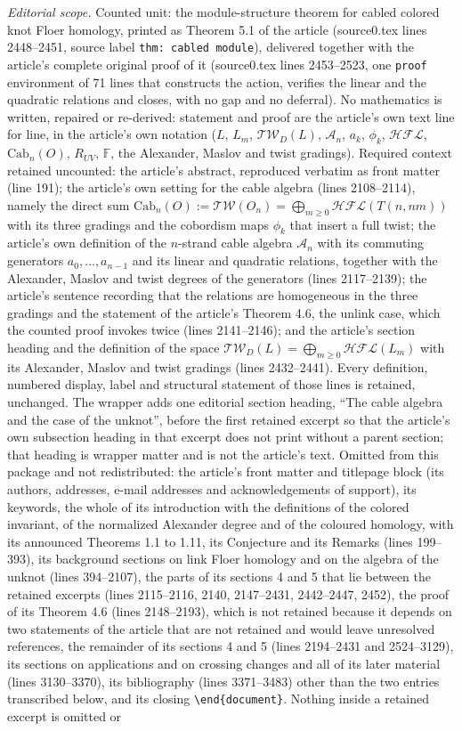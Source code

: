\documentclass[10pt,a4paper]{amsart}
\theoremstyle{plain}
\newcommand{\CA}{\mathcal{A}}
\newcommand{\Cab}{\mathrm{Cab}}
\newcommand{\Tw}{\mathcal{TW}}
\newcommand{\cHFL}{\mathcal{H\!F\! L}}
\newcommand{\F}{\mathbb{F}}
\begin{document}
\noindent\textit{Editorial scope.} Counted unit: the module-structure theorem for cabled colored knot Floer homology, printed as Theorem 5.1 of the article (source0.tex lines 2448--2451, source label \texttt{thm: cabled module}), delivered together with the article's complete original proof of it (source0.tex lines 2453--2523, one \texttt{proof} environment of 71 lines that constructs the action, verifies the linear and the quadratic relations and closes, with no gap and no deferral). No mathematics is written, repaired or re-derived: statement and proof are the article's own text line for line, in the article's own notation ($L$, $L_m$, $\Tw_D(L)$, $\CA_n$, $a_k$, $\phi_k$, $\cHFL$, $\Cab_n(O)$, $R_{UV}$, $\F$, the Alexander, Maslov and twist gradings). Required context retained uncounted: the article's abstract, reproduced verbatim as front matter (line 191); the article's own setting for the cable algebra (lines 2108--2114), namely the direct sum $\Cab_n(O):=\Tw(O_n)=\bigoplus_{m\ge 0}\cHFL(T(n,nm))$ with its three gradings and the cobordism maps $\phi_k$ that insert a full twist; the article's own definition of the $n$-strand cable algebra $\CA_n$ with its commuting generators $a_0,\dots,a_{n-1}$ and its linear and quadratic relations, together with the Alexander, Maslov and twist degrees of the generators (lines 2117--2139); the article's sentence recording that the relations are homogeneous in the three gradings and the statement of the article's Theorem 4.6, the unlink case, which the counted proof invokes twice (lines 2141--2146); and the article's section heading and the definition of the space $\Tw_D(L)=\bigoplus_{m\ge 0}\cHFL(L_m)$ with its Alexander, Maslov and twist gradings (lines 2432--2441). Every definition, numbered display, label and structural statement of those lines is retained, unchanged. The wrapper adds one editorial section heading, ``The cable algebra and the case of the unknot'', before the first retained excerpt so that the article's own subsection heading in that excerpt does not print without a parent section; that heading is wrapper matter and is not the article's text. Omitted from this package and not redistributed: the article's front matter and titlepage block (its authors, addresses, e-mail addresses and acknowledgements of support), its keywords, the whole of its introduction with the definitions of the colored invariant, of the normalized Alexander degree and of the coloured homology, with its announced Theorems 1.1 to 1.11, its Conjecture and its Remarks (lines 199--393), its background sections on link Floer homology and on the algebra of the unknot (lines 394--2107), the parts of its sections 4 and 5 that lie between the retained excerpts (lines 2115--2116, 2140, 2147--2431, 2442--2447, 2452), the proof of its Theorem 4.6 (lines 2148--2193), which is not retained because it depends on two statements of the article that are not retained and would leave unresolved references, the remainder of its sections 4 and 5 (lines 2194--2431 and 2524--3129), its sections on applications and on crossing changes and all of its later material (lines 3130--3370), its bibliography (lines 3371--3483) other than the two entries transcribed below, and its closing \texttt{\textbackslash end\{document\}}. Nothing inside a retained excerpt is omitted or 
\end{document}
